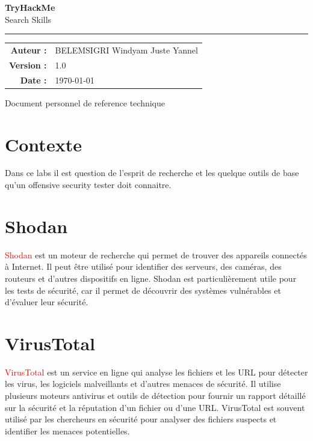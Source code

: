 \documentclass[11pt,a4paper]{book}
\begin{document}
\begin{titlepage}
\thispagestyle{empty}
\begin{center}
\vspace*{2cm}
{\Huge\sffamily\bfseries\color{bleuFonce} TryHackMe}\\[0.5em]
{\Large\sffamily\color{gris} Search Skills}
\vspace{1.5cm}

\textcolor{bleuClair}{\rule{0.3\textwidth}{1.5pt}}

\vspace{1.5cm}
\begin{tabular}{rl}
    \textcolor{gris}{\textbf{Auteur :}} & BELEMSIGRI Windyam Juste Yannel \\
    \textcolor{gris}{\textbf{Version :}} & 1.0 \\
    \textcolor{gris}{\textbf{Date :}} & \today \\
\end{tabular}

\vfill
{\small\sffamily\color{gris} Document personnel de reference technique}
\vspace{1cm}
\end{center}
\end{titlepage}

\tableofcontents
\newpage

\section{Contexte}
Dans ce labs il est question de l'esprit de recherche et les quelque outils de base qu'un offensive security tester doit connaitre.


\section{Shodan}
\textcolor{red}{Shodan} est un moteur de recherche qui permet de trouver des appareils connectés à Internet. 
Il peut être utilisé pour identifier des serveurs, des caméras, des routeurs et d'autres dispositifs en ligne. 
Shodan est particulièrement utile pour les tests de sécurité, car il permet de découvrir des systèmes vulnérables et d'évaluer leur sécurité.

\section{VirusTotal}
\textcolor{red}{VirusTotal} est un service en ligne qui analyse les fichiers et les URL pour détecter les virus, les logiciels malveillants et d'autres menaces de sécurité.
Il utilise plusieurs moteurs antivirus et outils de détection pour fournir un rapport détaillé sur la sécurité et la réputation d'un fichier ou d'une URL. VirusTotal est souvent utilisé par les chercheurs en sécurité pour analyser des fichiers suspects et identifier les menaces potentielles. 
\end{document}
